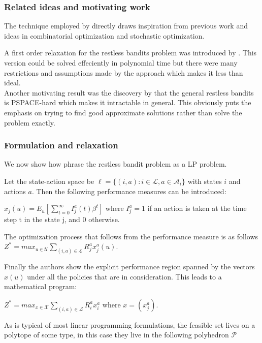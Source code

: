 \subsubsection{Related ideas and motivating work}
The technique employed by \citep{bertsimas} directly draws inspiration from previous work and ideas in combinatorial optimization and stochastic optimization. 

A first order relaxation for the restless bandits problem was introduced by \citep{whittle}. This version could be solved effeciently in polynomial time but there were many restrictions and assumptions made by the approach which makes it less than ideal.\\

Another motivating result was the discovery  by \citep{papad}that the general restless bandits is PSPACE-hard which makes it intractable in general. This obviously puts the emphasis on trying to find good approximate solutions rather than solve the problem exactly. \\ 

\subsubsection{Formulation and relaxation}

We now show how \citep{bertsimas} phrase the restless bandit problem as a LP problem. 

Let the state-action space be  $\ell= \{(i,a): i \in \mathcal{L}, a \in  \mathcal{A}_i \}$
with states $i$ and actions $a$. Then the following performance measures can be introduced:

$x_j(u) = E_u[\sum_{t=0}^{\infty}I_j^a(t) \beta^t]$ where $I_j^a = 1$ if an action is taken at the time step t in the state j, and 0 otherwise. 

The optimization process that follows from the performance measure is as follows 
$Z^* = max_{u \in \mathcal{U}} \sum_{(i,a) \in \mathcal{L}} R_j^a x_j^a(u)$.  

Finally the authors show the explicit performance region spanned by the vectors $x(u)$ under all the policies that are in consideration. This leads to a mathematical program: 

$Z^* = max_{x \in \mathcal{X}}\sum_{(i,a)\in \mathcal{L}}R_i^a x_i^a$ where $x = (x_j^a)$. 

As is typical of most linear programming formulations, the feasible set lives on a polytope of some type, in this case they live in the following polyhedron $\mathcal {P}$ 

